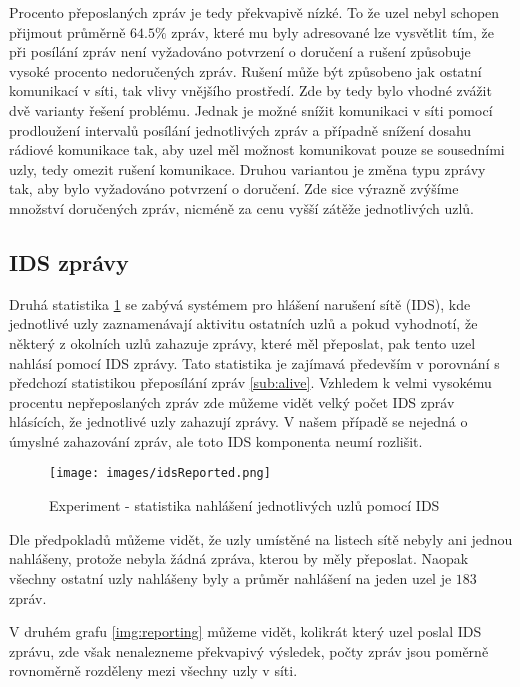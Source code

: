 \documentclass[11pt,final,twoside]{fithesis2}
\begin{document}
Procento přeposlaných zpráv je tedy překvapivě nízké. To že uzel nebyl schopen přijmout průměrně $64.5\%$ zpráv, které mu byly adresované lze vysvětlit tím, že při posílání zpráv není vyžadováno potvrzení o 
doručení a rušení způsobuje vysoké procento nedoručených zpráv. Rušení může být způsobeno jak ostatní komunikací v síti, tak vlivy vnějšího prostředí. Zde by tedy bylo vhodné zvážit dvě varianty řešení 
problému. Jednak je možné snížit komunikaci v síti pomocí prodloužení intervalů posílání jednotlivých zpráv a případně snížení dosahu rádiové komunikace tak, aby uzel měl možnost komunikovat pouze se 
sousedními uzly, tedy omezit rušení komunikace. Druhou variantou je změna typu zprávy tak, aby bylo vyžadováno potvrzení o doručení. Zde sice výrazně zvýšíme množství doručených zpráv, nicméně za cenu vyšší zátěže jednotlivých uzlů.


\subsection{IDS zprávy}

Druhá statistika \ref{img:reported} se zabývá systémem pro hlášení narušení sítě (IDS), kde jednotlivé uzly zaznamenávají aktivitu ostatních uzlů a pokud vyhodnotí, že některý z okolních uzlů zahazuje 
zprávy, které měl přeposlat, pak tento uzel nahlásí pomocí IDS zprávy. Tato statistika je zajímavá především v porovnání s předchozí statistikou přeposílání zpráv \ref{sub:alive}. Vzhledem k velmi vysokému 
procentu nepřeposlaných zpráv zde můžeme vidět velký počet IDS zpráv hlásících, že jednotlivé uzly zahazují zprávy. V našem případě se nejedná o úmyslné zahazování zpráv, ale toto IDS komponenta neumí 
rozlišit.

\begin{figure}[h]
     \centering
     \texttt{[image: images/idsReported.png]}
     \caption{Experiment - statistika nahlášení jednotlivých uzlů pomocí IDS}
     \label{img:reported}
\end{figure}

Dle předpokladů můžeme vidět, že uzly umístěné na listech sítě nebyly ani jednou nahlášeny, protože nebyla žádná zpráva, kterou by měly přeposlat. Naopak všechny ostatní uzly nahlášeny 
byly a průměr nahlášení na jeden uzel je $183$ zpráv. 

V druhém grafu \ref{img:reporting} můžeme vidět, kolikrát který uzel poslal IDS zprávu, zde však nenalezneme překvapivý výsledek, počty zpráv jsou poměrně rovnoměrně rozděleny mezi všechny uzly v síti. 
\end{document}

